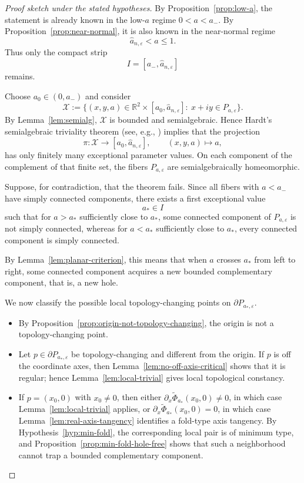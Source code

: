 \documentclass[11pt]{article}
\newcommand{\R}{\mathbb{R}}
\begin{document}
\begin{proof}[Proof sketch under the stated hypotheses]
By Proposition~\ref{prop:low-a}, the statement is already known in the low-\(a\) regime \(0<a<a_-\). By Proposition~\ref{prop:near-normal}, it is also known in the near-normal regime
\[
\widehat a_{n,\varepsilon}<a\le 1.
\]
Thus only the compact strip
\[
I=[a_-,\widehat a_{n,\varepsilon}]
\]
remains.

Choose \(a_0\in(0,a_-)\) and consider
\[
\mathcal X
:=
\{(x,y,a)\in \R^2\times [a_0,\widehat a_{n,\varepsilon}]:\ x+iy\in P_{a,\varepsilon}\}.
\]
By Lemma~\ref{lem:semialg}, \(\mathcal X\) is bounded and semialgebraic. Hence Hardt's semialgebraic triviality theorem (see, e.g., \cite{BCR}) implies that the projection
\[
\pi:\mathcal X\to [a_0,\widehat a_{n,\varepsilon}],\qquad (x,y,a)\mapsto a,
\]
has only finitely many exceptional parameter values. On each component of the complement of that finite set, the fibers \(P_{a,\varepsilon}\) are semialgebraically homeomorphic.

Suppose, for contradiction, that the theorem fails. Since all fibers with \(a<a_-\) have simply connected components, there exists a first exceptional value
\[
a_*\in I
\]
such that for \(a>a_*\) sufficiently close to \(a_*\), some connected component of \(P_{a,\varepsilon}\) is not simply connected, whereas for \(a<a_*\) sufficiently close to \(a_*\), every connected component is simply connected.

By Lemma~\ref{lem:planar-criterion}, this means that when \(a\) crosses \(a_*\) from left to right, some connected component acquires a new bounded complementary component, that is, a new hole.

We now classify the possible local topology-changing points on \(\partial P_{a_*,\varepsilon}\).

\begin{itemize}
\item By Proposition~\ref{prop:origin-not-topology-changing}, the origin is not a topology-changing point.

\item Let \(p\in\partial P_{a_*,\varepsilon}\) be topology-changing and different from the origin. If \(p\) is off the coordinate axes, then Lemma~\ref{lem:no-off-axis-critical} shows that it is regular; hence Lemma~\ref{lem:local-trivial} gives local topological constancy.

\item If \(p=(x_0,0)\) with \(x_0\neq 0\), then either \(\partial_x\widetilde\Phi_{a_*}(x_0,0)\neq 0\), in which case Lemma~\ref{lem:local-trivial} applies, or \(\partial_x\widetilde\Phi_{a_*}(x_0,0)=0\), in which case Lemma~\ref{lem:real-axis-tangency} identifies a fold-type axis tangency. By Hypothesis~\ref{hyp:min-fold}, the corresponding local pair is of minimum type, and Proposition~\ref{prop:min-fold-hole-free} shows that such a neighborhood cannot trap a bounded complementary component.


\end{itemize}
\end{proof}
\end{document}
